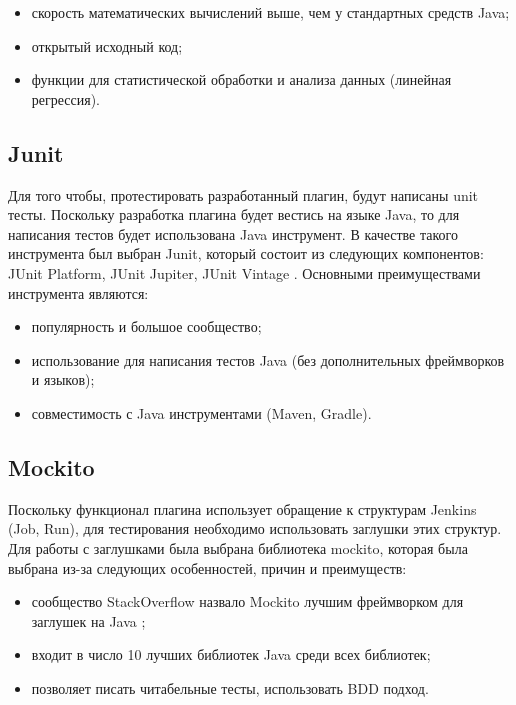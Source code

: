 \begin{itemize}
	\item скорость математических вычислений выше, чем у стандартных средств Java;
	\item открытый исходный код;
	\item функции для статистической обработки и анализа данных (линейная регрессия).
\end{itemize}

\subsection{Junit}

Для того чтобы, протестировать разработанный плагин, будут написаны unit тесты. Поскольку разработка плагина будет вестись на языке Java, то для написания тестов будет использована Java инструмент. В качестве такого инструмента был выбран Junit, который состоит из следующих компонентов:  JUnit Platform, JUnit Jupiter, JUnit Vintage \cite{junit}. Основными преимуществами инструмента являются:

\begin{itemize}
	\item популярность и большое сообщество;
	\item использование для написания тестов Java (без дополнительных фреймворков и языков);
	\item совместимость с Java инструментами (Maven, Gradle).
\end{itemize}

\subsection{Mockito}

Поскольку функционал плагина использует обращение к структурам Jenkins (Job, Run), для тестирования необходимо использовать заглушки этих структур. Для работы с заглушками была выбрана библиотека mockito, которая была выбрана из-за следующих особенностей, причин и преимуществ:

\begin{itemize}
	\item сообщество StackOverflow назвало Mockito лучшим фреймворком для заглушек на Java \cite{mockito};
	\item входит в число 10 лучших библиотек Java среди всех библиотек;
	\item позволяет писать читабельные тесты, использовать BDD подход.
\end{itemize}

